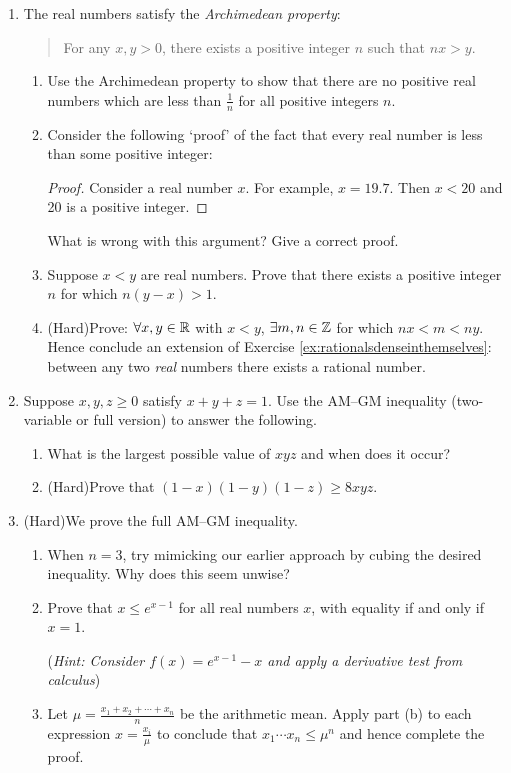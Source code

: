 \begin{exercises}{}{}
\begin{enumerate}
	
		\item The real numbers satisfy the \emph{Archimedean property}:
		\begin{quote}
			For any $x,y>0$, there exists a positive integer $n$ such that $nx>y$.
		\end{quote}
		\begin{enumerate}
		  \item Use the Archimedean property to show that there are no positive real numbers which are less than $\frac 1n$ for all positive integers $n$. 
	  
	  	\item Consider the following `proof' of the fact that every real number is less than some positive integer:
	  	\begin{proof}
	    	Consider a real number $x$. For example, $x = 19.7$. Then $x<20$ and 20 is a positive integer. 
	 		\end{proof}
	  	What is wrong with this argument? Give a correct proof.
		
			\item Suppose $x<y$ are real numbers. Prove that there exists a positive integer $n$ for which $n(y-x)>1$.
			
			\item (Hard)\lstsp Prove: $\forall x,y\in\mathbb{R}$ with $x<y$, $\exists m,n\in\mathbb{Z}$ for which $nx<m<ny$. Hence conclude an extension of Exercise \ref{ex:rationalsdenseinthemselves}: between any two \emph{real} numbers there exists a rational number.
		\end{enumerate}
	
	
		\item Suppose $x,y,z\ge 0$ satisfy $x+y+z=1$. Use the AM--GM inequality (two-variable or full version) to answer the following.
		\begin{enumerate}
		  \item What is the largest possible value of $xyz$ and when does it occur?
		  \item (Hard)\lstsp Prove that $(1-x)(1-y)(1-z)\ge 8xyz$.
		\end{enumerate}
    
    
		\item\label{exs:amgm-full} (Hard)\lstsp We prove the full AM--GM inequality.
		\begin{enumerate}
		  \item When $n=3$, try mimicking our earlier approach by cubing the desired inequality. Why does this seem unwise?
		  \item Prove that $x\le e^{x-1}$ for all real numbers $x$, with equality if and only if $x=1$.\par
		  (\emph{Hint: Consider $f(x)=e^{x-1}-x$ and apply a derivative test from calculus})
		  \item Let $\mu=\frac{x_1+x_2+\cdots +x_n}{n}$ be the arithmetic mean. Apply part (b) to each expression $x=\frac{x_i}\mu$ to conclude that $x_1\cdots x_n\le \mu^n$ and hence complete the proof.
		\end{enumerate}

	\end{enumerate}

\end{exercises}

